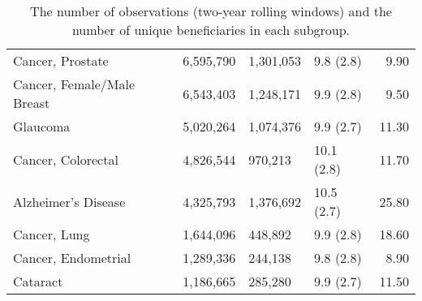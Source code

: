 \begin{table}[ht]
\begin{tabular}{llllr}
  Cancer, Prostate & 6,595,790 & 1,301,053 & 9.8 (2.8) & 9.90 \\ 
  Cancer, Female/Male Breast & 6,543,403 & 1,248,171 & 9.9 (2.8) & 9.50 \\ 
  Glaucoma & 5,020,264 & 1,074,376 & 9.9 (2.7) & 11.30 \\ 
  Cancer, Colorectal & 4,826,544 & 970,213 & 10.1 (2.8) & 11.70 \\ 
  Alzheimer's Disease & 4,325,793 & 1,376,692 & 10.5 (2.7) & 25.80 \\ 
  Cancer, Lung & 1,644,096 & 448,892 & 9.9 (2.8) & 18.60 \\ 
  Cancer, Endometrial & 1,289,336 & 244,138 & 9.8 (2.8) & 8.90 \\ 
  Cataract & 1,186,665 & 285,280 & 9.9 (2.7) & 11.50 \\ 
   \hline
\end{tabular}
\caption{The number of observations (two-year rolling windows) and the number
             of unique beneficiaries in each subgroup.} 
\label{tab:subgroup_n}
\end{table}
